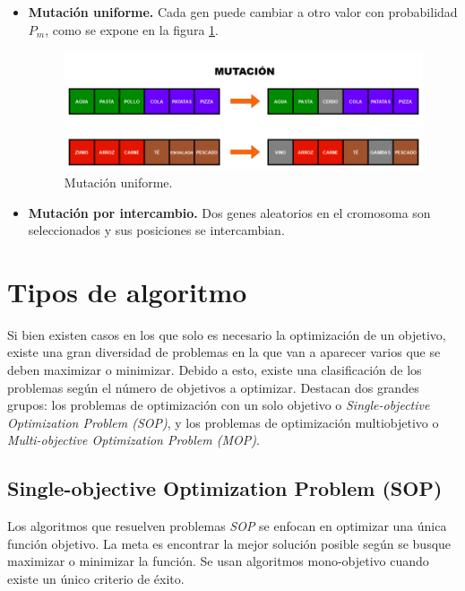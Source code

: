 \begin{itemize}
  \item \textbf{Mutación uniforme.} Cada gen puede cambiar a otro valor con probabilidad \(P_m\), como se expone en la figura \ref{fig:mutación}.

  \begin{figure}[H]
    \centering
    \includegraphics[width=1\textwidth]{figures/mutacion.png}
    \caption{Mutación uniforme.}
    \label{fig:mutación}
  \end{figure}

  \item \textbf{Mutación por intercambio.} Dos genes aleatorios en el cromosoma son seleccionados y sus posiciones se intercambian. 
\end{itemize}

\section{Tipos de algoritmo}

Si bien existen casos en los que solo es necesario la optimización de un objetivo, existe una gran diversidad de problemas en la que van a aparecer varios que se deben maximizar o minimizar. Debido a esto, existe una clasificación de los problemas según el número de objetivos a optimizar. Destacan dos grandes grupos: los problemas de optimización con un solo objetivo o \textit{Single-objective Optimization Problem (SOP)}, y los problemas de optimización multiobjetivo o \textit{Multi-objective Optimization Problem (MOP)}.

\subsection{Single-objective Optimization Problem (SOP)}

Los algoritmos que resuelven problemas \textit{SOP} se enfocan en optimizar una única función objetivo. La meta es encontrar la mejor solución posible según se busque maximizar o minimizar la función. Se usan algoritmos mono-objetivo cuando existe un único criterio de éxito.

